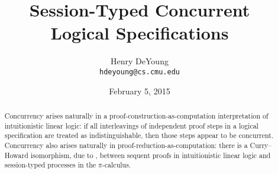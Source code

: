 \documentclass{hdeyoung-proposal}
\begin{document}
\title{Session-Typed Concurrent\\Logical Specifications}
\author{Henry DeYoung\\\texttt{hdeyoung@cs.cmu.edu}}
\date{February 5, 2015}
\maketitle

\begin{abstract}
% 
% 
% 
% 
% 
\noindent
Concurrency arises naturally in a proof-construction-as-computation interpretation of intuitionistic linear logic: if all interleavings of independent proof steps in a logical specification are treated as indistinguishable, then those steps appear to be concurrent. 
Concurrency also arises naturally in proof-reduction-as-computation: there is a Curry--Howard isomorphism, due to \citeauthor{Caires+Pfenning:CONCUR10}, between sequent proofs in intuitionistic linear logic and session-typed processes in the $\pi$-calculus.


\end{abstract}
\end{document}

